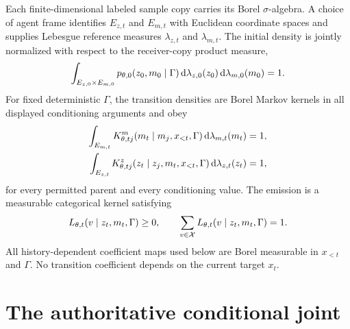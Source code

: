 Each finite-dimensional labeled sample copy carries its Borel $\sigma$-algebra. A choice of agent frame identifies $E_{z,t}$ and $E_{m,t}$ with Euclidean coordinate spaces and supplies Lebesgue reference measures $\lambda_{z,t}$ and $\lambda_{m,t}$. The initial density is jointly normalized with respect to the receiver-copy product measure,
\begin{equation}
\int_{E_{z,0}\times E_{m,0}}
p_{\theta,0}(z_0,m_0\mid\Gamma)
\mathop{\mathrm d\lambda_{z,0}(z_0)}
\mathop{\mathrm d\lambda_{m,0}(m_0)}
=1.
\label{eq:normalized-initial-law}
\end{equation}
For fixed deterministic $\Gamma$, the transition densities are Borel Markov kernels in all displayed conditioning arguments and obey
\begin{equation}
\begin{aligned}
\int_{E_{m,t}}K^m_{\theta,tj}
(m_t\mid m_j,x_{<t},\Gamma)
\mathop{\mathrm d\lambda_{m,t}(m_t)}&=1,\\
\int_{E_{z,t}}K^z_{\theta,tj}
(z_t\mid z_j,m_t,x_{<t},\Gamma)
\mathop{\mathrm d\lambda_{z,t}(z_t)}&=1,
\end{aligned}
\label{eq:normalized-transition-kernels}
\end{equation}
for every permitted parent and every conditioning value.  The emission is a measurable categorical kernel satisfying
\begin{equation}
L_{\theta,t}(v\mid z_t,m_t,\Gamma)\geq0,
\qquad
\sum_{v\in\mathcal X}L_{\theta,t}(v\mid z_t,m_t,\Gamma)=1.
\label{eq:normalized-emission-kernel}
\end{equation}
All history-dependent coefficient maps used below are Borel measurable in $x_{<t}$ and $\Gamma$.  No transition coefficient depends on the current target $x_t$.

\section{The authoritative conditional joint}

